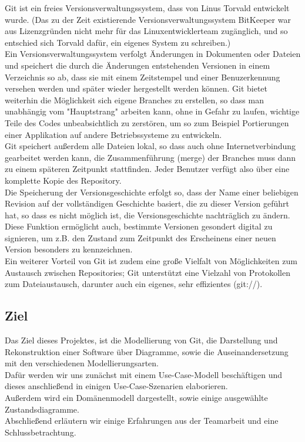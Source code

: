 \documentclass[a4paper]{article}
\begin{document}
Git ist ein freies Versionsverwaltungssystem, dass von Linus Torvald entwickelt wurde.
(Das zu der Zeit existierende Versionsverwaltungssystem BitKeeper war aus Lizenzgründen nicht mehr für das Linuxentwicklerteam zugänglich, und so entschied sich Torvald dafür, ein eigenes System zu schreiben.) \\
Ein Versionsverwaltungssystem verfolgt Änderungen in Dokumenten oder Dateien und speichert die durch die Änderungen entstehenden Versionen in einem Verzeichnis so ab, dass sie mit einem Zeitstempel und einer Benuzerkennung versehen werden und später wieder hergestellt werden können. Git bietet weiterhin die Möglichkeit sich eigene \gls{Branch}es zu erstellen, so dass man unabhängig vom "Hauptstrang" arbeiten kann, ohne in Gefahr zu laufen, wichtige Teile des Codes unbeabsichtlich zu zerstören, um so zum Beispiel Portierungen einer Applikation auf andere Betriebssysteme zu entwickeln. \\
Git speichert außerdem alle Dateien lokal, so dass auch ohne Internetverbindung gearbeitet werden kann, die Zusammenführung (\gls{merge}) der Branches muss dann zu einem späteren Zeitpunkt stattfinden. Jeder Benutzer verfügt also über eine komplette Kopie des \gls{Repository}. \\
Die Speicherung der Versionsgeschichte erfolgt so, dass der Name einer beliebigen Revision auf der vollständigen Geschichte basiert, die zu dieser Version geführt hat, so dass es nicht möglich ist, die Versionsgeschichte nachträglich zu ändern. Diese Funktion ermöglicht auch, bestimmte Versionen gesondert digital zu signieren, um z.B. den Zustand zum Zeitpunkt des Erscheinens einer neuen Version besonders zu kennzeichnen. \\
Ein weiterer Vorteil von Git ist zudem eine große Vielfalt von Möglichkeiten zum Austausch zwischen Repositories; Git unterstützt eine Vielzahl von Protokollen zum Dateiaustausch, darunter auch ein eigenes, sehr effizientes (git://).\\


\subsection{Ziel}
	Das Ziel dieses Projektes, ist die Modellierung von Git, die Darstellung und Rekonstruktion einer Software über Diagramme, sowie die Auseinandersetzung mit den verschiedenen Modellierungsarten. \\
	Dafür werden wir uns zunächst mit einem Use-Case-Modell beschäftigen und dieses anschließend in einigen Use-Case-Szenarien elaborieren. \\
	Außerdem wird ein Domänenmodell dargestellt, sowie einige ausgewählte Zustandsdiagramme.\\
	Abschließend erläutern wir einige Erfahrungen aus der Teamarbeit und eine Schlussbetrachtung.
\newpage												%
\end{document}
